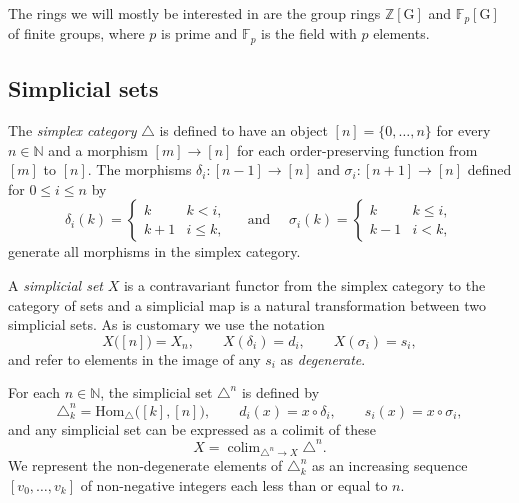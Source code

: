 \documentclass[A4]{amsart}
\theoremstyle{definition}
\newcommand{\Z}{\mathbb{Z}}
\newcommand{\Hom}{\mathrm{Hom}}
\DeclareMathOperator*{\colim}{colim}
\begin{document}
The rings we will mostly be interested in are the group rings $\Z[\mathrm G]$ and $\mathbb{F}_p[\mathrm G]$ of finite groups, where $p$ is prime and $\mathbb{F}_p$ is the field with $p$ elements.

\subsection{Simplicial sets}

The \textit{simplex category} $\triangle$ is defined to have an object $[n] = \{0, \dots, n\}$ for every $n \in \mathbb{N}$ and a morphism $[m] \to [n]$ for each order-preserving function from $[m]$ to $[n]$. The morphisms $\delta_i : [n-1] \to [n]$ and $\sigma_i : [n+1] \to [n]$ defined for $0 \leq i \leq n$ by
\begin{equation*}
\delta_i(k) = 
\begin{cases} k & k < i, \\ k+1 & i \leq k, \end{cases}
\quad \text{ and } \quad
\sigma_i(k) = 
\begin{cases} k & k \leq i, \\ k-1 & i < k, \end{cases}
\end{equation*} 
generate all morphisms in the simplex category.

A \textit{simplicial set} $X$ is a contravariant functor from the simplex category to the category of sets and a simplicial map is a natural transformation between two simplicial sets. As is customary we use the notation
\begin{equation*}
X\big( [n] \big) = X_n, \qquad X(\delta_i) = d_i, \qquad X(\sigma_i) = s_i,
\end{equation*}
and refer to elements in the image of any $s_i$ as \textit{degenerate}.

For each $n \in \mathbb{N}$, the simplicial set $\triangle^n$ is defined by
\begin{equation*}
\triangle^n_k  = \Hom_{\triangle} \big( [k], [n] \big), \qquad 
d_i(x) = x \circ \delta_i, \qquad 
s_i(x) = x \circ \sigma_i,
\end{equation*}
and any simplicial set can be expressed as a colimit of these
\begin{equation*}
X = \colim_{\triangle^n \to X} \triangle^n.
\end{equation*}
We represent the non-degenerate elements of $\triangle^n_k$ as an increasing sequence $[v_0, \dots, v_k]$ of non-negative integers each less than or equal to $n$.
\end{document}
